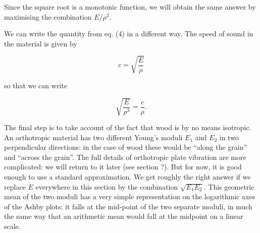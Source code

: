   Since the square root is a monotonic function, we will obtain the same answer 
  by maximising the combination $E/\rho^3$. 

  We can write the quantity from eq. (4) in a different way. The speed of sound 
  in the material is given by 

  \begin{equation*}c=\sqrt{\dfrac{E}{\rho}}\tag{5}\end{equation*} 

  \noindent{}so that we can write 

  \begin{equation*} \sqrt{\dfrac{E}{\rho^3}} = \dfrac{c}{\rho}. 
  \tag{6}\end{equation*} 

  The final step is to take account of the fact that wood is by no means 
  isotropic. An orthotropic material has two different Young's moduli $E_1$ and 
  $E_2$ in two perpendicular directions: in the case of wood these would be 
  ``along the grain'' and ``across the grain''. The full details of orthotropic 
  plate vibration are more complicated: we will return to it later (see section 
  ?). But for now, it is good enough to use a standard approximation. We get 
  roughly the right answer if we replace $E$ everywhere in this section by the 
  combination $\sqrt{E_1E_2}$. This geometric mean of the two moduli has a very 
  simple representation on the logarithmic axes of the Ashby plots: it falls at 
  the mid-point of the two separate moduli, in much the same way that an 
  arithmetic mean would fall at the midpoint on a linear scale. 